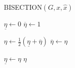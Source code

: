 \begin{algorithm}
\caption{BISECTION$(G, x,\hat{x})$}
\label{alg:bisection}
\begin{algorithmic}[1]

\STATE $\underline{\eta}\leftarrow 0$
\STATE $\overline{\eta}\leftarrow 1$

\WHILE{$\overline{\eta}-\underline{\eta}>\epsilon$}
	\STATE $\eta \leftarrow \frac{1}{2}(\underline{\eta}+\overline{\eta})$
		\STATE $\overline{\eta}\leftarrow \eta$

	\ELSE
		\STATE $\underline{\eta}\leftarrow \eta$
	\ENDIF
\ENDWHILE
\RETURN $\eta$

\end{algorithmic}
\end{algorithm}
